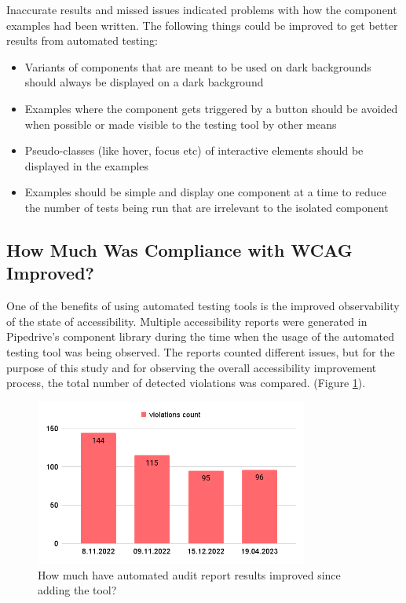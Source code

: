 \documentclass{master_thesis}
\begin{document}
Inaccurate results and missed issues indicated problems with how the component examples had been written. The following things could be improved to get better results from automated testing:
\begin{itemize}
	\item Variants of components that are meant to be used on dark backgrounds should always be displayed on a dark background
	\item Examples where the component gets triggered by a button should be avoided when possible or made visible to the testing tool by other means
	\item Pseudo-classes (like hover, focus etc) of interactive elements should be displayed in the examples
	\item Examples should be simple and display one component at a time to reduce the number of tests being run that are irrelevant to the isolated component
\end{itemize}

\subsection{How Much Was Compliance with WCAG Improved?}


One of the benefits of using automated testing tools is the improved observability of the state of accessibility.
Multiple accessibility reports were generated in Pipedrive's component library during the time when the usage of the automated testing tool was being observed. The reports counted different
issues, but for the purpose of this study and for observing the overall accessibility improvement process, the total number of detected violations was compared. (Figure \ref{fig:automted-reports}).

\begin{figure}[ht]
	\centering
	\includegraphics[width=0.8\textwidth]{img/automated-audit-reports.png}
	\caption{How much have automated audit report results improved since adding the tool?}
	\label{fig:automted-reports}
\end{figure}
\end{document}
